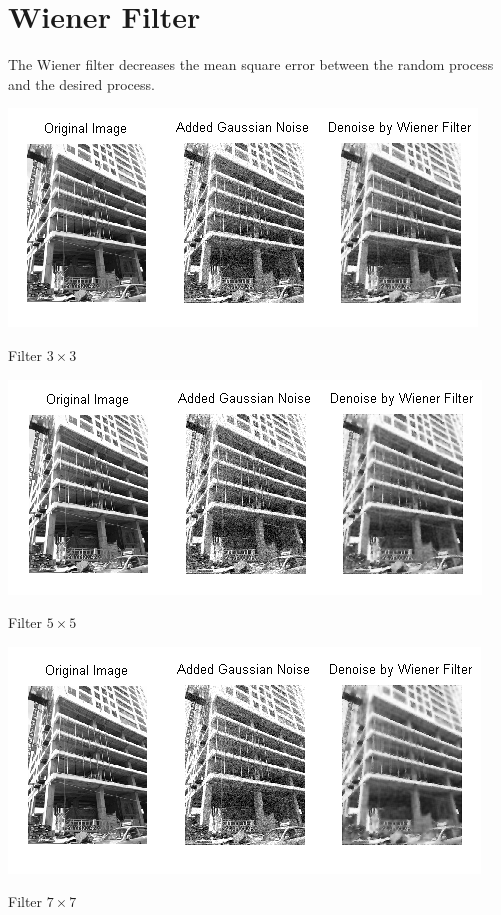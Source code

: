 \section{Wiener Filter}
The Wiener filter decreases the mean square error between the random process and the desired process.

\vspace{2cm}
\begin{center}
\includegraphics{Wienec3.png}

Filter $3\times3$

\newpage
\includegraphics{Wienec5.png}

Filter $5\times5$
\vspace{2cm}


\includegraphics{Wienec7.png}

Filter $7\times7$

\end{center}






